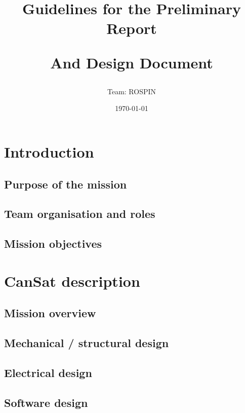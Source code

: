 \documentclass[11pt]{article}
\title{Guidelines for the Preliminary Report

And Design Document
}
\author{Team: ROSPIN}
\date{\today}
\begin{document}
\cansattitle

\tableofcontents
\pagestyle{plain}

\newpage

\section{Introduction}

\subsection{Purpose of the mission}

\subsection{Team organisation and roles}

\subsection{Mission objectives}


\section{CanSat description}

\subsection{Mission overview}

\subsection{Mechanical / structural design}

\subsection{Electrical design}

\subsection{Software design}
\end{document}
